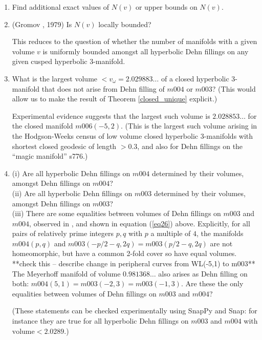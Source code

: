 \documentclass[reqno]{amsproc}  %
\def\ms{\medskip\noindent}
\def\ss{\smallskip\noindent}
\begin{document}
\begin{enumerate}

\item Find additional exact values of $N(v)$ or upper bounds on $N(v)$.

\ms
\item (Gromov \cite{Gr}, 1979) Is $N(v)$ locally bounded?

\ss
This reduces to the question of whether the number of manifolds with a given volume $v$
is uniformly bounded amongst all hyperbolic Dehn fillings on any given cusped hyperbolic 3-manifold. 

\ms
\item What is the largest volume $< v_\omega= 2.029883\ldots$
of a closed hyperbolic 3-manifold 
that does not arise from Dehn filling of $m004$ or $m003$?
(This would allow us to make the result of Theorem \ref{closed_unique} explicit.)

\ss
Experimental evidence suggests that the largest such volume is
$2.028853\ldots$
for the closed manifold $m006(-5,2)$.
(This is the largest such volume arising in the Hodgson-Weeks census
of low volume closed hyperbolic 3-manifolds with 
shortest closed geodesic of length $>0.3$,
and also for Dehn fillings on the ``magic manifold'' s776.)

\ms
\item (i) Are all hyperbolic Dehn fillings on $m004$ determined by their volumes,
amongst Dehn fillings on $m004$?\\
(ii) Are all hyperbolic Dehn fillings on $m003$ determined by their volumes, 
amongst Dehn fillings on $m003$?\\
(iii) There are some equalities  between volumes of Dehn fillings on $m003$ and $m004$,
observed in \cite{HMW}, and shown in equation (\ref{eq26}) above.
Explicitly, for all pairs of relatively prime integers $p,q$ 
with $p$ a multiple of $4$, the manifolds $m004(p,q)$ and 
$m003(-p/2-q,2q)=m003(p/2-q,2q)$ are not homeomorphic, 
but have a common 2-fold cover so have equal volumes. 
**check this -- describe change in peripheral curves from WL(-5,1) to m003**
\fi
The Meyerhoff manifold of volume $0.981368\ldots$ also arises as Dehn filling on both:
$m004(5,1)=m003(-2,3) = m003(-1, 3)$.
Are these the only equalities between volumes of Dehn fillings on $m003$ and $m004$?

\ss
(These statements can be checked experimentally using SnapPy and Snap:
for instance they are true for all hyperbolic  Dehn fillings  
on $m003$ and $m004$
with $\text{volume} < 2.0289$.)


\end{enumerate}
\end{document}

